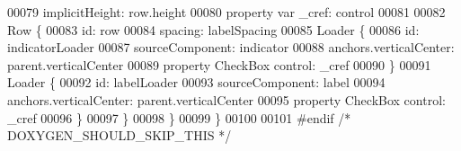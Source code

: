 \begin{DoxyCode}
00079         implicitHeight: row.height
00080         \textcolor{keyword}{property} var \_cref: control
00081 
00082         Row \{
00083             \textcolor{keywordtype}{id}: row
00084             spacing: labelSpacing
00085             Loader \{
00086                 \textcolor{keywordtype}{id}: indicatorLoader
00087                 sourceComponent: indicator
00088                 anchors.verticalCenter: parent.verticalCenter
00089                 \textcolor{keyword}{property} CheckBox control: \_cref
00090             \}
00091             Loader \{
00092                 \textcolor{keywordtype}{id}: labelLoader
00093                 sourceComponent: label
00094                 anchors.verticalCenter: parent.verticalCenter
00095                 \textcolor{keyword}{property} CheckBox control: \_cref
00096             \}
00097         \}
00098     \}
00099 \}
00100 
00101 \textcolor{preprocessor}{#endif }\textcolor{comment}{/* DOXYGEN\_SHOULD\_SKIP\_THIS */}\textcolor{preprocessor}{}
\end{DoxyCode}
